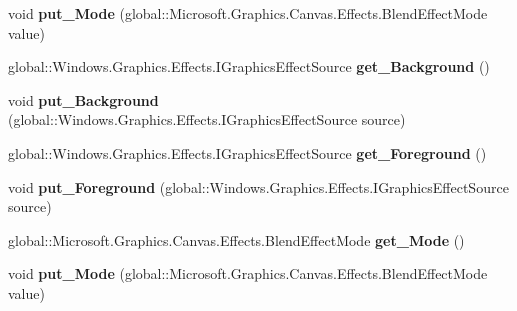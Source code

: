 \begin{DoxyCompactItemize}
void {\bfseries put\+\_\+\+Mode} (global\+::\+Microsoft.\+Graphics.\+Canvas.\+Effects.\+Blend\+Effect\+Mode value)
\item 
\mbox{\label{interface_microsoft_1_1_graphics_1_1_canvas_1_1_effects_1_1_i_blend_effect_a9bf514b43e36b2488c8d53157b276ac0}} 
global\+::\+Windows.\+Graphics.\+Effects.\+I\+Graphics\+Effect\+Source {\bfseries get\+\_\+\+Background} ()
\item 
\mbox{\label{interface_microsoft_1_1_graphics_1_1_canvas_1_1_effects_1_1_i_blend_effect_a16dda1810dcd399600c55e24b03baa2c}} 
void {\bfseries put\+\_\+\+Background} (global\+::\+Windows.\+Graphics.\+Effects.\+I\+Graphics\+Effect\+Source source)
\item 
\mbox{\label{interface_microsoft_1_1_graphics_1_1_canvas_1_1_effects_1_1_i_blend_effect_a27971086ad5738eee6bc56e8fa2047a8}} 
global\+::\+Windows.\+Graphics.\+Effects.\+I\+Graphics\+Effect\+Source {\bfseries get\+\_\+\+Foreground} ()
\item 
\mbox{\label{interface_microsoft_1_1_graphics_1_1_canvas_1_1_effects_1_1_i_blend_effect_a9bc8bd434ced7607b3252e64f0a1cf9f}} 
void {\bfseries put\+\_\+\+Foreground} (global\+::\+Windows.\+Graphics.\+Effects.\+I\+Graphics\+Effect\+Source source)
\item 
\mbox{\label{interface_microsoft_1_1_graphics_1_1_canvas_1_1_effects_1_1_i_blend_effect_ac8d75c7f80a966ae4cb4accb65b3f2ba}} 
global\+::\+Microsoft.\+Graphics.\+Canvas.\+Effects.\+Blend\+Effect\+Mode {\bfseries get\+\_\+\+Mode} ()
\item 
\mbox{\label{interface_microsoft_1_1_graphics_1_1_canvas_1_1_effects_1_1_i_blend_effect_a74ac8a0ad43cf91117230932b4bf02f3}} 
void {\bfseries put\+\_\+\+Mode} (global\+::\+Microsoft.\+Graphics.\+Canvas.\+Effects.\+Blend\+Effect\+Mode value)
\item 

\end{DoxyCompactItemize}
